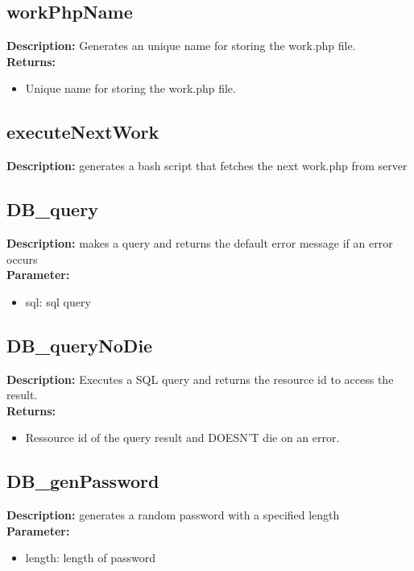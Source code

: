 \subsection{workPhpName}
\textbf{Description:} Generates an unique name for storing the work.php file.\\
\textbf{Returns:}
\begin{itemize}
\item Unique name for storing the work.php file.
\end{itemize}

\subsection{executeNextWork}
\textbf{Description:} generates a bash script that fetches the next work.php from server\\

\subsection{DB\_query}
\textbf{Description:} makes a query and returns the default error message if an error occurs\\
\textbf{Parameter:}
\begin{itemize}
\item sql: sql query
\end{itemize}

\subsection{DB\_queryNoDie}
\textbf{Description:} Executes a SQL query and returns the resource id to access the result.\\
\textbf{Returns:}
\begin{itemize}
\item Ressource id of the query result and DOESN'T die on an error.
\end{itemize}

\subsection{DB\_genPassword}
\textbf{Description:} generates a random password with a specified length\\
\textbf{Parameter:}
\begin{itemize}
\item length: length of password
\end{itemize}


